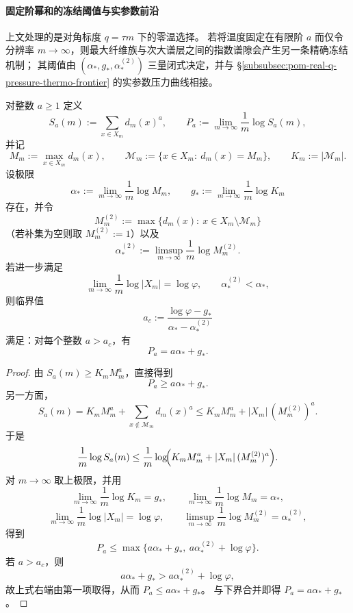 \paragraph{固定阶幂和的冻结阈值与实参数前沿}
上文处理的是对角标度 \(q=\tau m\) 下的零温选择。
若将温度固定在有限阶 \(a\) 而仅令分辨率 \(m\to\infty\)，则最大纤维族与次大谱层之间的指数谱隙会产生另一条精确冻结机制；
其阈值由 \((\alpha_\ast,g_\ast,\alpha_\ast^{(2)})\) 三量闭式决定，并与 \S\ref{subsubsec:pom-real-q-pressure-thermo-frontier} 的实参数压力曲线相接。

\begin{theorem}[固定阶幂和的精确冻结阈值]\label{thm:xi-terminal-fixed-order-freezing-threshold}
对整数 \(a\ge 1\) 定义
\[
S_a(m):=\sum_{x\in X_m}d_m(x)^a,
\qquad
P_a:=\lim_{m\to\infty}\frac{1}{m}\log S_a(m),
\]
并记
\[
M_m:=\max_{x\in X_m}d_m(x),\qquad
\mathcal M_m:=\{x\in X_m:\ d_m(x)=M_m\},\qquad
K_m:=|\mathcal M_m|.
\]
设极限
\[
\alpha_\ast:=\lim_{m\to\infty}\frac{1}{m}\log M_m,
\qquad
g_\ast:=\lim_{m\to\infty}\frac{1}{m}\log K_m
\]
存在，并令
\[
M_m^{(2)}:=\max\{d_m(x):\ x\in X_m\setminus\mathcal M_m\}
\]
（若补集为空则取 \(M_m^{(2)}:=1\)）以及
\[
\alpha_\ast^{(2)}:=\limsup_{m\to\infty}\frac{1}{m}\log M_m^{(2)}.
\]
若进一步满足
\[
\lim_{m\to\infty}\frac{1}{m}\log|X_m|=\log\varphi,
\qquad
\alpha_\ast^{(2)}<\alpha_\ast,
\]
则临界值
\[
a_c:=\frac{\log\varphi-g_\ast}{\alpha_\ast-\alpha_\ast^{(2)}}
\]
满足：对每个整数 \(a>a_c\)，有
\[
\boxed{\;P_a=a\alpha_\ast+g_\ast.\;}
\]
\end{theorem}
\begin{proof}
由 \(S_a(m)\ge K_mM_m^a\)，直接得到
\[
P_a\ge a\alpha_\ast+g_\ast.
\]
另一方面，
\[
S_a(m)=K_mM_m^a+\sum_{x\notin\mathcal M_m}d_m(x)^a
\le K_mM_m^a+|X_m|\,(M_m^{(2)})^a.
\]
于是
\[
\frac{1}{m}\log S_a(m)
\le
\frac{1}{m}\log\!\Bigl(K_mM_m^a+|X_m|\,(M_m^{(2)})^a\Bigr).
\]
对 \(m\to\infty\) 取上极限，并用
\[
\lim_{m\to\infty}\frac{1}{m}\log K_m=g_\ast,\qquad
\lim_{m\to\infty}\frac{1}{m}\log M_m=\alpha_\ast,
\]
\[
\lim_{m\to\infty}\frac{1}{m}\log|X_m|=\log\varphi,\qquad
\limsup_{m\to\infty}\frac{1}{m}\log M_m^{(2)}=\alpha_\ast^{(2)},
\]
得到
\[
P_a\le \max\{a\alpha_\ast+g_\ast,\ a\alpha_\ast^{(2)}+\log\varphi\}.
\]
若 \(a>a_c\)，则
\[
a\alpha_\ast+g_\ast>a\alpha_\ast^{(2)}+\log\varphi,
\]
故上式右端由第一项取得，从而 \(P_a\le a\alpha_\ast+g_\ast\)。
与下界合并即得
\(
P_a=a\alpha_\ast+g_\ast
\)。
\end{proof}


